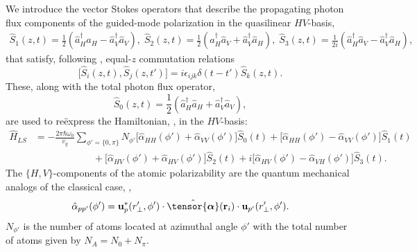 \documentclass[preprint,aps,pra,onecolumn]{revtex4-1} %
\newcommand{\poltens}{\hat{\tensor{\boldsymbol{\alpha}}}}
\begin{document}
We introduce the vector Stokes operators that describe the propagating photon flux components of the guided-mode polarization in the quasilinear $HV$-basis,
	\begin{align} \label{Eq::StokesComponents}
		\hat{S}_1(z,t) = \frac{1}{2}\left(\hat{a}^\dag_H \hat{a}_H-\hat{a}^\dag_V \hat{a}_V \right), \; \hat{S}_2(z,t) = \frac{1}{2}\left(\hat{a}^\dag_H \hat{a}_V+\hat{a}^\dag_V \hat{a}_H \right), \; \hat{S}_3(z,t) = \frac{1}{2i}\left(\hat{a}^\dag_H \hat{a}_V-\hat{a}^\dag_V \hat{a}_H \right),
	\end{align}
that satisfy, following , equal-$z$ commutation relations
	\begin{equation} \label{Eq::StokesCommutation}
		\big[\hat{S}_i(z,t), \hat{S}_j(z,t')\big] =i \epsilon_{ijk} \delta(t-t')  \hat{S}_k(z,t).
	\end{equation}
These, along with the total photon flux operator,
	\begin{equation}
		\hat{S}_0(z,t) = \frac{1}{2}\left(\hat{a}^\dag_H \hat{a}_H+\hat{a}^\dag_V \hat{a}_V \right),
	\end{equation}
are used to re\"{e}xpress the Hamiltonian, , in the $HV$-basis: 
	\begin{align}  
		\hat{H}_{LS} & = -\frac{2 \pi \hbar \omega_0}{v_g} \sum_{\phi' = \{ 0, \pi\} }N_{\phi'} \big[\hat{\alpha}_{HH}(\phi')+\hat{\alpha}_{VV}(\phi') \big] \hat{S}_0(t) +  \big[\hat{\alpha}_{HH}(\phi') -\hat{\alpha}_{VV}(\phi') \big] \hat{S}_1(t) \label{Eq::GenHamiltonian} \\
	&\quad \quad \quad \quad \quad \quad+ \big[\hat{\alpha}_{HV}(\phi')+\hat{\alpha}_{HV}(\phi') \big]  \hat{S}_2(t) + i  \big[\hat{\alpha}_{HV}(\phi')-\hat{\alpha}_{VH}(\phi') \big]\hat{S}_3(t).  \nonumber
	\end{align}
The $\{H,V\}$-components of the atomic polarizability are the quantum mechanical analogs of the classical case, , 
	\begin{equation}  \label{Eq::PolarizabilityElementsQuantum} 
		\hat{\alpha}_{p p'}(\phi') = \mathbf{u}^*_p(r'_{\perp},\phi')  \cdot \poltens(\mbf{r}_i) \cdot \mathbf{u}_{p'}(r'_{\perp},\phi').
	\end{equation}
$N_{\phi'}$ is the number of atoms located at azimuthal angle $\phi'$ with the total number of atoms given by $N_A = N_0 + N_\pi$.
\end{document}
